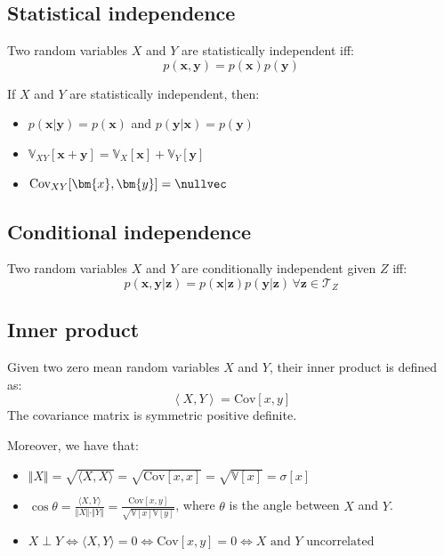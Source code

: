 \subsection{Statistical independence}
Two random variables $X$ and $Y$ are statistically independent iff:
\[ p(\bm{x}, \bm{y}) = p(\bm{x})p(\bm{y}) \]

\begin{theorem}
    If $X$ and $Y$ are statistically independent, then:
    \begin{itemize}
        \item $p(\bm{x} \vert \bm{y}) = p(\bm{x})$ and $p(\bm{y} \vert \bm{x}) = p(\bm{y})$
        \item $\mathbb{V}_{XY}[\bm{x} + \bm{y}] = \mathbb{V}_X[\bm{x}] + \mathbb{V}_Y[\bm{y}]$
        \item $\text{Cov}_{XY}[\bm{x}, \bm{y}] = \nullvec$
    \end{itemize}
\end{theorem}


\subsection{Conditional independence}
Two random variables $X$ and $Y$ are conditionally independent given $Z$ iff:
\[ p(\bm{x}, \bm{y} \vert \bm{z}) = p(\bm{x} \vert \bm{z}) p(\bm{y} \vert \bm{z}) \, \forall \bm{z} \in \mathcal{T}_Z \]


\subsection{Inner product}
Given two zero mean random variables $X$ and $Y$, their inner product is defined as:
\[ \left\langle X, Y \right\rangle = \text{Cov}[x, y] \]
The covariance matrix is symmetric positive definite.

Moreover, we have that:
\begin{itemize}
    \item $\Vert X \Vert = \sqrt{\langle X, X \rangle} = \sqrt{\text{Cov}[x, x]} = \sqrt{\mathbb{V}[x]} = \sigma[x]$
    \item 
        $\cos\theta = \frac{\langle X, Y \rangle}{\Vert X \Vert \cdot \Vert Y \Vert} = 
        \frac{\text{Cov}[x, y]}{\sqrt{\mathbb{V}[x]\mathbb{V}[y]}}$, where $\theta$ is the angle between $X$ and $Y$.
    \item $X \perp Y \iff \langle X, Y \rangle = 0 \iff \text{Cov}[x, y] = 0 \iff X \text{ and } Y \text{ uncorrelated}$
\end{itemize}



